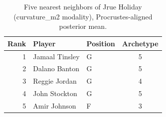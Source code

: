 \begin{table}[htbp]
  \centering\small
  \begin{tabular}{rllc}
    \toprule
    Rank & Player & Position & Archetype \\
    \midrule
    1 & Jamaal Tinsley & G & 5 \\
    2 & Dalano Banton & G & 5 \\
    3 & Reggie Jordan & G & 4 \\
    4 & John Stockton & G & 5 \\
    5 & Amir Johnson & F & 3 \\
    \bottomrule
  \end{tabular}
  \caption{Five nearest neighbors of Jrue Holiday (curvature_m2 modality), Procrustes-aligned posterior mean.}
  \label{tab:Jrue_Holiday_neighbors_curvature_m2}
\end{table}


